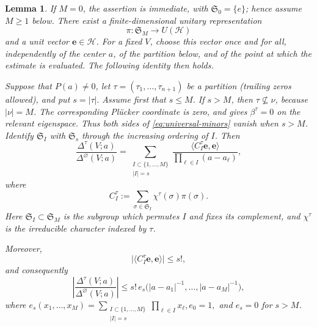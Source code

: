 \documentclass[12pt,letterpaper,reqno]{amsart}
\newtheorem{lem}[thm]{Lemma}
\theoremstyle{definition}
\numberwithin{equation}{section}
\newcommand{\ev}{\bm  e}
\begin{document}
\begin{lem}\label{lem:universal-minors}
If \(M=0\), the assertion is immediate, with
\(\mathfrak S_0=\{e\}\); hence assume \(M\geq1\) below.
There exist a finite-dimensional unitary representation
\[
\pi:\mathfrak S_M\longrightarrow U(\mathcal H)
\]
and a unit vector \(\ev\in\mathcal H\). For a fixed \(V\), choose this
vector once and for all, independently of the center \(a\), of the
partition below, and of the point at which the estimate is evaluated.
The following identity then holds.

Suppose that \(P(a)\ne0\), let
\(\tau=(\tau_1,\ldots,\tau_{n+1})\) be a partition (trailing zeros
allowed), and put
$
s=|\tau|.
$
Assume first that \(s\leq M\). If \(s>M\), then
\(\tau\not\subseteq\nu\), because \(|\nu|=M\). The corresponding
Pl\"ucker coordinate is zero, and
\cite[Theorem~1.3(v)]{KP26} gives \(\beta^\tau=0\) on the relevant
eigenspace. Thus both sides of \eqref{eq:universal-minors} vanish when
\(s>M\). Identify \(\mathfrak S_I\) with \(\mathfrak S_s\) through the
increasing ordering of \(I\).
Then
\begin{equation}\label{eq:universal-minors}
 \frac{\Delta^\tau(V;a)}{\Delta^\varnothing(V;a)}
 =
 \sum_{\substack{I\subset\{1,\ldots,M\}\\|I|=s}}
 \frac{\langle C_I^\tau\ev,\ev\rangle}
      {\prod_{\ell\in I}(a-a_\ell)},
\end{equation}
where
\begin{equation}\label{eq:CI-definition}
 C_I^\tau
 :=
 \sum_{\sigma\in\mathfrak S_I}
 \chi^\tau(\sigma)\pi(\sigma).
\end{equation}
Here \(\mathfrak S_I\subset\mathfrak S_M\) is the subgroup which
permutes \(I\) and fixes its complement, and \(\chi^\tau\) is the
irreducible character indexed by \(\tau\).

Moreover,
\begin{equation}\label{eq:projectionbound}
 \bigl|\langle C_I^\tau\ev,\ev\rangle\bigr|
 \leq s!,
\end{equation}
and consequently
\begin{equation}\label{eq:minor-es-bound}
 \left|
 \frac{\Delta^\tau(V;a)}{\Delta^\varnothing(V;a)}
 \right|
 \leq
 s!\,
 e_s\bigl(
 |a-a_1|^{-1},\ldots,|a-a_M|^{-1}
 \bigr),
\end{equation}
where
$
e_s(x_1,\ldots,x_M)
=
\sum_{\substack{I\subset\{1,\ldots,M\}\\|I|=s}}
\prod_{\ell\in I}x_\ell,
e_0=1,
$
and \(e_s=0\) for \(s>M\).
\end{lem}
\end{document}
